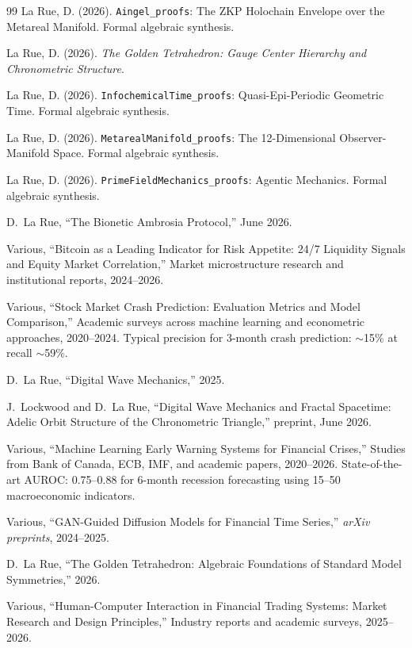\begin{thebibliography}{99}
La Rue, D. (2026).
\texttt{Aingel\_proofs}: The ZKP Holochain Envelope over the Metareal Manifold.
Formal algebraic synthesis.

La Rue, D. (2026).
\textit{The Golden Tetrahedron: Gauge Center Hierarchy and Chronometric Structure}.

La Rue, D. (2026).
\texttt{InfochemicalTime\_proofs}: Quasi-Epi-Periodic Geometric Time.
Formal algebraic synthesis.

La Rue, D. (2026).
\texttt{MetarealManifold\_proofs}: The 12-Dimensional Observer-Manifold Space.
Formal algebraic synthesis.

La Rue, D. (2026).
\texttt{PrimeFieldMechanics\_proofs}: Agentic Mechanics.
Formal algebraic synthesis.

D.~La Rue,
``The Bionetic Ambrosia Protocol,''
June 2026.

Various,
``Bitcoin as a Leading Indicator for Risk Appetite: 24/7 Liquidity Signals and Equity Market Correlation,''
Market microstructure research and institutional reports, 2024--2026.

Various,
``Stock Market Crash Prediction: Evaluation Metrics and Model Comparison,''
Academic surveys across machine learning and econometric approaches, 2020--2024.
Typical precision for 3-month crash prediction: $\sim$15\% at recall $\sim$59\%.

D.~La Rue,
``Digital Wave Mechanics,'' 2025.

J.~Lockwood and D.~La Rue, ``Digital Wave Mechanics and Fractal Spacetime: Adelic Orbit Structure of the Chronometric Triangle,'' preprint, June 2026.

Various,
``Machine Learning Early Warning Systems for Financial Crises,''
Studies from Bank of Canada, ECB, IMF, and academic papers, 2020--2026.
State-of-the-art AUROC: 0.75--0.88 for 6-month recession forecasting using 15--50 macroeconomic indicators.

Various,
``GAN-Guided Diffusion Models for Financial Time Series,''
\emph{arXiv preprints}, 2024--2025.

D.~La Rue,
``The Golden Tetrahedron: Algebraic Foundations of Standard Model Symmetries,''
2026.

Various,
``Human-Computer Interaction in Financial Trading Systems: Market Research and Design Principles,''
Industry reports and academic surveys, 2025--2026.


\end{thebibliography}
